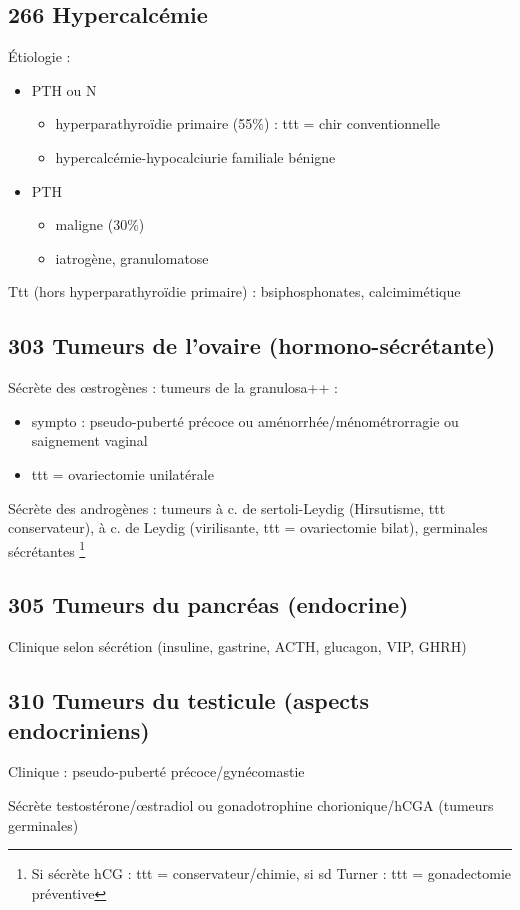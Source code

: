 \documentclass[11pt]{article}
\begin{document}
\subsection{266 Hypercalcémie}
\label{sec:org2935cf0}
Étiologie :
\begin{itemize}
\item PTH \inc ou N
\begin{itemize}
\item hyperparathyroïdie primaire (55\%) : ttt = chir conventionnelle
\item hypercalcémie-hypocalciurie familiale bénigne
\end{itemize}
\item PTH \dec
\begin{itemize}
\item maligne (30\%)
\item iatrogène, granulomatose
\end{itemize}
\end{itemize}
Ttt (hors hyperparathyroïdie primaire) : bsiphosphonates, calcimimétique
\subsection{303 Tumeurs de l'ovaire (hormono-sécrétante)}
\label{sec:org797547a}
Sécrète des \oe{}strogènes : tumeurs de la granulosa++ : 
\begin{itemize}
\item sympto : pseudo-puberté précoce ou aménorrhée/ménométrorragie ou saignement vaginal
\item ttt = ovariectomie unilatérale
\end{itemize}
Sécrète des androgènes : tumeurs à c. de sertoli-Leydig (Hirsutisme, ttt
conservateur), à c. de Leydig (virilisante, ttt = ovariectomie bilat),
germinales sécrétantes \footnote{Si sécrète hCG : ttt = conservateur/chimie, si sd
Turner : ttt = gonadectomie préventive}
\subsection{305 Tumeurs du pancréas (endocrine)}
\label{sec:org3942bb4}
Clinique selon sécrétion (insuline, gastrine, ACTH, glucagon, VIP, GHRH)
\subsection{310 Tumeurs du testicule (aspects endocriniens)}
\label{sec:org3511abe}
Clinique : pseudo-puberté précoce/gynécomastie

Sécrète testostérone/\oe{}stradiol ou gonadotrophine chorionique/hCGA (tumeurs
germinales)
\end{document}
